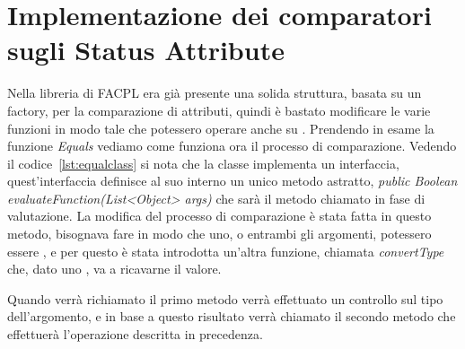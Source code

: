 \section{Implementazione dei comparatori sugli Status Attribute} %
\label{sec:implementazione_dei_comparatori_sugli_status_attribute}
Nella libreria di FACPL era già presente una solida struttura, basata su un factory, per la comparazione di attributi, quindi è bastato modificare le varie funzioni in modo tale che potessero operare anche su \statusattribute.
Prendendo in esame la funzione \textit{Equals} vediamo come funziona ora il processo di comparazione.
Vedendo il codice~\ref{lst:equalclass} si nota che la classe implementa un interfaccia, quest'interfaccia definisce al suo interno un unico metodo astratto, \textit{public Boolean evaluateFunction(List<Object> args)} che sarà il metodo chiamato in fase di valutazione.
La modifica del processo di comparazione è stata fatta in questo metodo, bisognava fare in modo che uno, o entrambi gli argomenti, potessero essere \statusattribute, e per questo è stata introdotta un'altra funzione, chiamata \textit{convertType} che, dato uno \statusattribute, va a ricavarne il valore.\\ \par
Quando verrà richiamato il primo metodo verrà effettuato un controllo sul tipo dell'argomento, e in base a questo risultato verrà chiamato il secondo metodo che effettuerà l'operazione descritta in precedenza.



